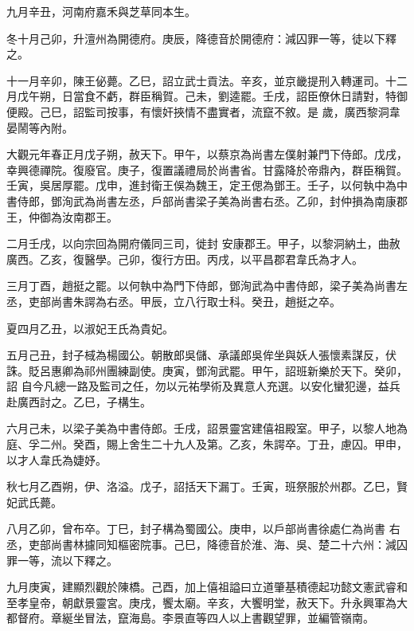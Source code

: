 \begin{pinyinscope}
 九月辛丑，河南府嘉禾與芝草同本生。



 冬十月己卯，升澶州為開德府。庚辰，降德音於開德府：減囚罪一等，徒以下釋之。



 十一月辛卯，陳王佖薨。乙巳，詔立武士貢法。辛亥，並京畿提刑入轉運司。十二月戊午朔，日當食不虧，群臣稱賀。己未，劉逵罷。壬戌，詔臣僚休日請對，特御便殿。己巳，詔監司按事，有懷奸挾情不盡實者，流竄不敘。是
 歲，廣西黎洞韋晏鬧等內附。



 大觀元年春正月戊子朔，赦天下。甲午，以蔡京為尚書左僕射兼門下侍郎。戊戌，幸興德禪院。復廢官。庚子，復置議禮局於尚書省。甘露降於帝鼎內，群臣稱賀。壬寅，吳居厚罷。戊申，進封衛王俁為魏王，定王偲為鄧王。壬子，以何執中為中書侍郎，鄧洵武為尚書左丞，戶部尚書梁子美為尚書右丞。乙卯，封仲損為南康郡王，仲御為汝南郡王。



 二月壬戌，以向宗回為開府儀同三司，徙封
 安康郡王。甲子，以黎洞納土，曲赦廣西。乙亥，復醫學。己卯，復行方田。丙戌，以平昌郡君韋氏為才人。



 三月丁酉，趙挺之罷。以何執中為門下侍郎，鄧洵武為中書侍郎，梁子美為尚書左丞，吏部尚書朱諤為右丞。甲辰，立八行取士科。癸丑，趙挺之卒。



 夏四月乙丑，以淑妃王氏為貴妃。



 五月己丑，封子棫為楊國公。朝散郎吳儲、承議郎吳侔坐與妖人張懷素謀反，伏誅。貶呂惠卿為祁州團練副使。庚寅，鄧洵武罷。甲午，詔班新樂於天下。癸卯，詔
 自今凡總一路及監司之任，勿以元祐學術及異意人充選。以安化蠻犯邊，益兵赴廣西討之。乙巳，子構生。



 六月己未，以梁子美為中書侍郎。壬戌，詔景靈宮建僖祖殿室。甲子，以黎人地為庭、孚二州。癸酉，賜上舍生二十九人及第。乙亥，朱諤卒。丁丑，慮囚。甲申，以才人韋氏為婕妤。



 秋七月乙酉朔，伊、洛溢。戊子，詔括天下漏丁。壬寅，班祭服於州郡。乙巳，賢妃武氏薨。



 八月乙卯，曾布卒。丁巳，封子構為蜀國公。庚申，以戶部尚書徐處仁為尚書
 右丞，吏部尚書林攄同知樞密院事。己巳，降德音於淮、海、吳、楚二十六州：減囚罪一等，流以下釋之。



 九月庚寅，建顯烈觀於陳橋。己酉，加上僖祖謚曰立道肇基積德起功懿文憲武睿和至孝皇帝，朝獻景靈宮。庚戌，饗太廟。辛亥，大饗明堂，赦天下。升永興軍為大都督府。章綖坐冒法，竄海島。李景直等四人以上書觀望罪，並編管嶺南。




\end{pinyinscope}
